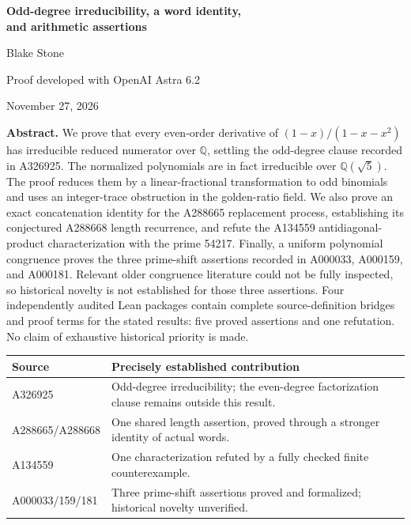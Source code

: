 \documentclass[11pt]{article}
\newcommand{\Q}{\mathbb Q}
\begin{document}
\begin{center}
{\LARGE\bfseries Odd-degree irreducibility, a word identity,\\[3pt]
and arithmetic assertions}\par
\vspace{0.5em}
{\large Blake Stone}\par
Proof developed with OpenAI Astra 6.2\par
November 27, 2026
\end{center}

\textbf{Abstract.}
We prove that every even-order derivative of
$(1-x)/(1-x-x^2)$ has irreducible reduced numerator over $\Q$,
settling the odd-degree clause recorded in A326925. The normalized
polynomials are in fact irreducible over $\Q(\sqrt5)$. The proof reduces
them by a linear-fractional transformation to odd binomials and uses an
integer-trace obstruction in the golden-ratio field. We also prove an exact
concatenation identity for the A288665 replacement process, establishing
its conjectured A288668 length recurrence, and refute the A134559
antidiagonal-product characterization with the prime 54217. Finally, a
uniform polynomial congruence proves the three prime-shift assertions
recorded in A000033, A000159, and A000181. Relevant older congruence
literature could not be fully inspected, so historical novelty is not
established for those three assertions. Four independently audited Lean
packages contain complete source-definition bridges and proof terms for
the stated results: five proved assertions and one refutation. No claim
of exhaustive historical priority is made.

\begin{center}
\begin{tabular}{@{}l>{\raggedright\arraybackslash}p{4.8in}@{}}
\toprule
Source & Precisely established contribution\\
\midrule
A326925 & Odd-degree irreducibility; the even-degree factorization clause remains outside this result.\\
A288665/A288668 & One shared length assertion, proved through a stronger identity of actual words.\\
A134559 & One characterization refuted by a fully checked finite counterexample.\\
A000033/159/181 & Three prime-shift assertions proved and formalized; historical novelty unverified.\\
\bottomrule
\end{tabular}
\end{center}
\end{document}
